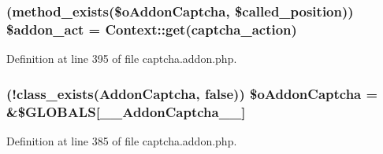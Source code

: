 \subsubsection[{\$addon\+\_\+act}]{ (method\+\_\+exists(\$o\+Addon\+Captcha, \$called\+\_\+position)) \$addon\+\_\+act = {\bf Context\+::get}(\textquotesingle{}captcha\+\_\+action\textquotesingle{})}\label{captcha_8addon_8php_a75413f1382fb293fee30843cf3834785}


Definition at line 395 of file captcha.\+addon.\+php.

\hypertarget{captcha_8addon_8php_ab9ab3bb5657fc72fca17e44743d1d20a}{}
\subsubsection[{\$o\+Addon\+Captcha}]{ (!class\+\_\+exists(\textquotesingle{}Addon\+Captcha\textquotesingle{}, false)) \$o\+Addon\+Captcha = \&\$G\+L\+O\+B\+A\+L\+S\mbox{[}\textquotesingle{}\+\_\+\+\_\+\+Addon\+Captcha\+\_\+\+\_\+\textquotesingle{}\mbox{]}}\label{captcha_8addon_8php_ab9ab3bb5657fc72fca17e44743d1d20a}


Definition at line 385 of file captcha.\+addon.\+php.

